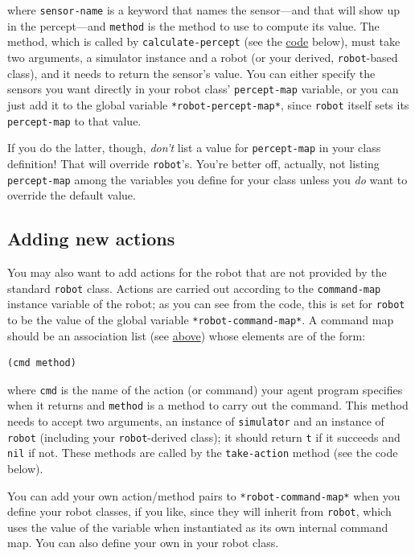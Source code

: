 \documentclass[11pt]{tufte-handout}
\begin{document}
\noindent where \texttt{sensor-name} is a keyword that names the sensor---and that will show up in the percept---and \texttt{method} is the method to use to compute its value.  The method, which is called by \texttt{calculate-percept} (see the \hyperref[orge28bcd1]{code} below), must take two arguments, a simulator instance and a robot (or your derived, \texttt{robot}-based class), and it needs to return the sensor's value.  You can either specify the sensors you want directly in your robot class' \texttt{percept-map} variable, or you can just add it to the global variable \texttt{*robot-percept-map*}, since \texttt{robot} itself sets its \texttt{percept-map} to that value.

If you do the latter, though, \emph{don't} list a value for \texttt{percept-map} in your class definition!  That will override \texttt{robot}'s.  You're better off, actually,  not listing \texttt{percept-map} among the variables you define for your class unless you \emph{do} want to override the default value.

\subsection{Adding new actions}
\label{sec:org928d1a1}

You may also want to add actions for the robot that are not provided by the standard \texttt{robot} class.  Actions are carried out according to the \texttt{command-map} instance variable of the robot; as you can see from the code, this is set for \texttt{robot} to be the value of the global variable \texttt{*robot-command-map*}.  A command map should be an association list (see \hyperref[org4949049]{above}) whose elements are of the form:
\begin{verbatim}
(cmd method)
\end{verbatim}

\noindent where \texttt{cmd} is the name of the action (or command) your agent program specifies when it returns and \texttt{method} is  a method to carry out the command.  This method needs to accept two arguments, an instance of \texttt{simulator} and an instance of \texttt{robot} (including your \texttt{robot}-derived class); it should return \texttt{t} if it succeeds and \texttt{nil} if not.  These methods are called by the \texttt{take-action} method (see the code below).

You can add your own action/method pairs to \texttt{*robot-command-map*} when you define your robot classes, if you like, since they will inherit from \texttt{robot}, which uses the value of the variable when instantiated as its own internal command map.   You can also define your own in your robot class.
\end{document}
